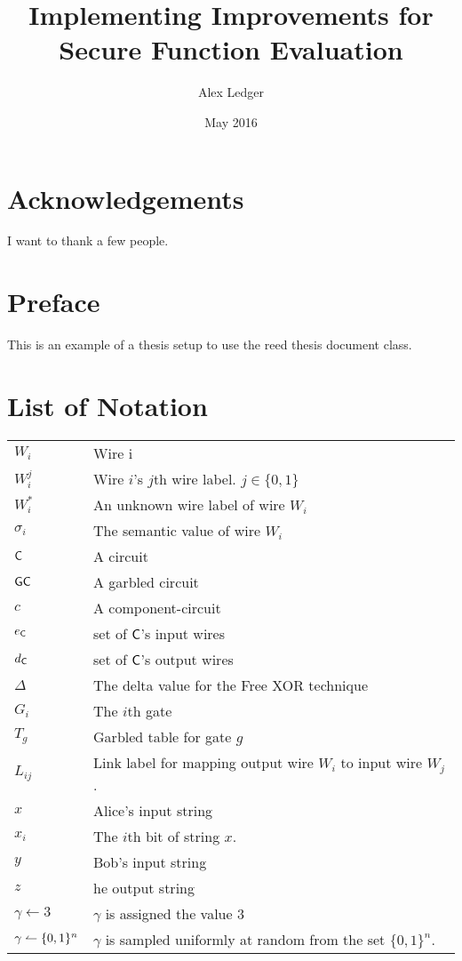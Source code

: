 \documentclass[12pt,twoside]{reedthesis}
\title{Implementing Improvements for Secure Function Evaluation}
\author{Alex Ledger}
\date{May 2016}
\begin{document}
\maketitle
\frontmatter %
\pagestyle{empty} %


\chapter*{Acknowledgements}
I want to thank a few people.

\chapter*{Preface}
This is an example of a thesis setup to use the reed thesis document class.

\chapter*{List of Notation}

\begin{table}[h]
\centering %
\begin{tabular}{ll}
    $W_i$ & Wire i \\
    $W_i^j$ & Wire $i$'s $j$th wire label. $j \in \{0,1\}$ \\
    $W_i^*$ & An unknown wire label of wire $W_i$ \\
    $\sigma_i$ & The semantic value of wire $W_i$ \\
    $\sf {C}$ & A circuit \\
    $\sf {GC}$ & A garbled circuit \\
    $c$ & A component-circuit \\
    $e_{\sf {C}}$ & set of $\sf {C}$'s input wires \\
    $d_{\sf {C}}$ & set of $\sf {C}$'s output wires \\
    $\Delta$ & The delta value for the Free XOR technique \\
    $G_i$ & The $i$th gate \\
    $T_g$  & Garbled table for gate $g$ \\
    $L_{ij}$ & Link label for mapping output wire $W_i$ to input wire $W_j$. \\
    $x$ & Alice's input string \\
    $x_i$ & The $i$th bit of string $x$. \\
    $y$ & Bob's input string \\
    $z$ & he output string \\
    $\gamma \gets 3$ & $\gamma$ is assigned the value $3$ \\
    $\gamma \leftharpoonup \{0,1\}^n$ & $\gamma$ is sampled uniformly at random from the set $\{0,1\}^n$. \\

\end{tabular}
\end{table}
	
\end{document}
